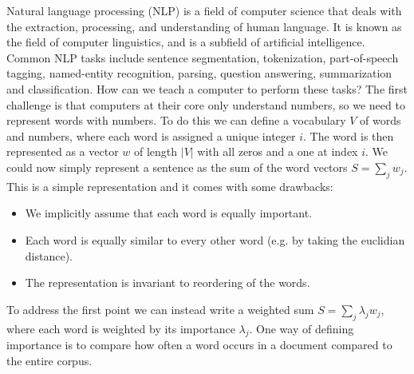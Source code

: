 Natural language processing (NLP) is a field of computer science that deals with the extraction, processing, and understanding of human language.
It is known as the field of computer linguistics, and is a subfield of artificial intelligence.
Common NLP tasks include sentence segmentation, tokenization, part-of-speech tagging, named-entity recognition, parsing, question answering, summarization and classification.
How can we teach a computer to perform these tasks?
The first challenge is that computers at their core only understand numbers, so we need to represent words with numbers.
To do this we can define a vocabulary $V$ of words and numbers, where each word is assigned a unique integer $i$.
The word is then represented as a vector $w$ of length $|V|$ with all zeros and a one at index $i$.
We could now simply represent a sentence as the sum of the word vectors $S = \sum_j w_j$.
This is a simple representation and it comes with some drawbacks:
\begin{itemize}
    \item We implicitly assume that each word is equally important.
    \item Each word is equally similar to every other word (e.g. by taking the euclidian distance).
    \item The representation is invariant to reordering of the words.
\end{itemize}
To address the first point we can instead write a weighted sum $S = \sum_j \lambda_j w_j$, where each word is weighted by its importance $\lambda_j$.
One way of defining importance is to compare how often a word occurs in a document compared to the entire corpus.


